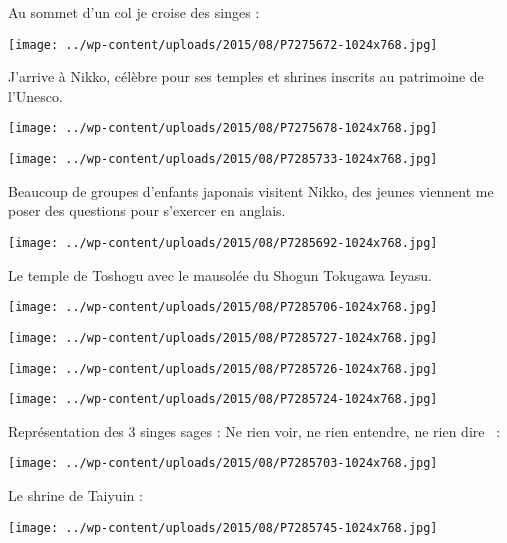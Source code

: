 \pagebreak
 Au sommet d'un col je croise des singes :
\begin{center} \texttt{[image: ../wp-content/uploads/2015/08/P7275672-1024x768.jpg]} \end{center}

 J'arrive à Nikko, célèbre pour ses temples et shrines inscrits au patrimoine de l'Unesco. 
\begin{center} \texttt{[image: ../wp-content/uploads/2015/08/P7275678-1024x768.jpg]} \end{center}
\begin{center} \texttt{[image: ../wp-content/uploads/2015/08/P7285733-1024x768.jpg]} \end{center}

  Beaucoup de groupes d'enfants japonais visitent Nikko, des jeunes viennent me poser des questions pour s'exercer en anglais. 
\begin{center} \texttt{[image: ../wp-content/uploads/2015/08/P7285692-1024x768.jpg]} \end{center}

\pagebreak
 Le temple de Toshogu avec le mausolée du Shogun Tokugawa Ieyasu. 
\begin{center} \texttt{[image: ../wp-content/uploads/2015/08/P7285706-1024x768.jpg]} \end{center}
\begin{center} \texttt{[image: ../wp-content/uploads/2015/08/P7285727-1024x768.jpg]} \end{center}
\begin{center} \texttt{[image: ../wp-content/uploads/2015/08/P7285726-1024x768.jpg]} \end{center}
\begin{center} \texttt{[image: ../wp-content/uploads/2015/08/P7285724-1024x768.jpg]} \end{center}

\pagebreak
 Représentation des 3 singes sages : \og Ne rien voir, ne rien entendre, ne rien dire \fg\ :
\begin{center} \texttt{[image: ../wp-content/uploads/2015/08/P7285703-1024x768.jpg]} \end{center}

 Le shrine de Taiyuin :
\begin{center} \texttt{[image: ../wp-content/uploads/2015/08/P7285745-1024x768.jpg]} \end{center}

